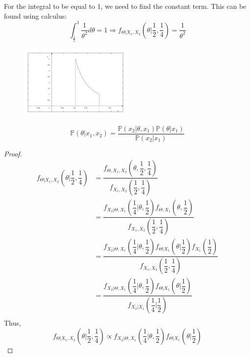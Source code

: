 \begin{eg}
  For the integral to be equal to 1, we need to find the constant term. This can be found using calculus: 
  \[
    \int_\frac{1}{2} ^1 \dfrac{1}{\theta^2} d \theta = 1 \Longrightarrow f_{\Theta \vert X_1, X_2} \left(\theta \Big| \dfrac{1}{2}, \dfrac{1}{4}\right) = \dfrac{1}{\theta^2}
  \]

  \begin{figure}[H]
    \centering
    \includegraphics[width=0.5\textwidth]{Figures/Romeo_model_2.pdf}
  \end{figure}
\end{eg}
\begin{remark}
  \[
    \mathbb{P}(\theta \vert x_1, x_2) = \dfrac{\mathbb{P}(x_2 \vert \theta, x_1) \mathbb{P}(\theta \vert x_1)}{\mathbb{P}(x_2 \vert x_1)}
  \]
\end{remark}
\begin{proof}
  \[
    \begin{aligned}
      f_{\Theta \vert X_1, X_2} \left(\theta \Big| \dfrac{1}{2}, \dfrac{1}{4}\right) &= \dfrac{f_{\Theta, X_1, X_2} \left(\theta, \dfrac{1}{2}, \dfrac{1}{4}\right)}{f_{X_1, X_2}\left(\dfrac{1}{2}, \dfrac{1}{4}\right)} \\
      &= \dfrac{f_{X_2 \vert \Theta, X_1} \left(\dfrac{1}{4} \Big| \theta, \dfrac{1}{2}\right) f_{\Theta, X_1}\left(\theta, \dfrac{1}{2}\right)}{f_{X_1, X_2}\left(\dfrac{1}{2}, \dfrac{1}{4}\right)} \\
      &= \dfrac{f_{X_2 \vert \Theta, X_1} \left(\dfrac{1}{4} \Big| \theta, \dfrac{1}{2}\right) f_{\Theta \vert X_1}\left(\theta \Big| \dfrac{1}{2}\right) f_{X_1} \left(\dfrac{1}{2}\right)}{f_{X_1, X_2}\left(\dfrac{1}{2}, \dfrac{1}{4}\right)} \\
      &= \dfrac{f_{X_2 \vert \Theta, X_1} \left(\dfrac{1}{4} \Big| \theta, \dfrac{1}{2}\right) f_{\Theta \vert X_1}\left(\theta \Big| \dfrac{1}{2}\right)}{f_{X_2 \vert X_1}\left(\dfrac{1}{4} \Big| \dfrac{1}{2}\right)} \\
    \end{aligned}
  \]
  Thus, 
  \[
    f_{\Theta \vert X_1, X_2} \left(\theta \Big| \dfrac{1}{2}, \dfrac{1}{4}\right) \propto f_{X_2 \vert \Theta, X_1} \left(\dfrac{1}{4} \Big| \theta, \dfrac{1}{2}\right) f_{\Theta \vert X_1}\left(\theta \Big| \dfrac{1}{2}\right)
  \]
\end{proof}